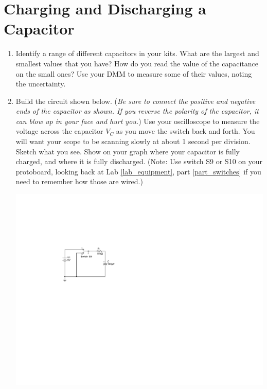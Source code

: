 \section{Charging and Discharging a Capacitor}
\label{lab_capacitors}
\pagestyle{labfancy} %


\bigskip

\begin{enumerate}[wide]

\item Identify a range of different capacitors in your kits.  What are the largest and smallest values that you have? How do you read the value of the capacitance on the small ones?  Use your DMM to measure some of their values, noting the uncertainty. 

\item Build the circuit shown below.  (\textit{Be sure to connect the positive and negative ends of the capacitor as shown.  If you reverse the polarity of the capacitor, it can blow up in your face and hurt you.})  Use your oscilloscope to measure the voltage across the capacitor $V_C$ as you move the switch back and forth.  You will want your scope to be scanning slowly at about 1 second per division.  Sketch what you see.  Show on your graph where your capacitor is fully charged, and where it is fully discharged.  (Note: Use switch S9 or S10 on your protoboard, looking back at Lab \ref{lab_equipment}, part \ref{part_switches} if you need to remember how those are wired.) \label{part_rc_circuit}
\begin{center}
\includegraphics{capacitors/single_dc_capacitor.pdf}
\hspace{0.5in}
\end{center}


\end{enumerate}
